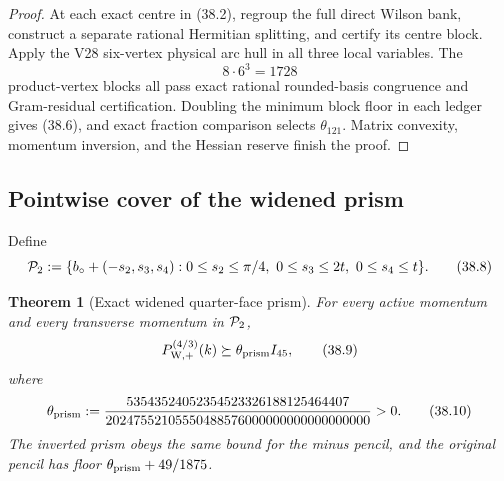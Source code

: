\documentclass[11pt,oneside]{article}
\newtheorem{theorem}{Theorem}[section]
\theoremstyle{definition}
\theoremstyle{remark}
\begin{document}
\begin{proof}
At each exact centre in (38.2), regroup the full direct Wilson bank,
construct a separate rational Hermitian splitting, and certify its
centre block.  Apply the V28 six-vertex physical arc hull in all
three local variables.  The
\[
 8\cdot6^3=1728                                        \tag{38.7}
\]
product-vertex blocks all pass exact rational rounded-basis
congruence and Gram-residual certification.  Doubling the minimum
block floor in each ledger gives (38.6), and exact fraction
comparison selects \(\theta_{121}\).  Matrix convexity, momentum
inversion, and the Hessian reserve finish the proof.
\end{proof}

\subsection{Pointwise cover of the widened prism}

Define
\[
 {\cal P}_2:=
 \{b_\circ+(-s_2,s_3,s_4):
 0\le s_2\le\pi/4,\ 0\le s_3\le2t,\ 0\le s_4\le t\}.
                                                               \tag{38.8}
\]

\begin{theorem}[Exact widened quarter-face prism]
\label{thm:newv38-prism}
For every active momentum and every transverse momentum in
\({\cal P}_2\),
\[
 P_{\mathrm W,+}^{(4/3)}(k)
 \succeq\theta_{\rm prism}I_{45},                     \tag{38.9}
\]
where
\[
 \theta_{\rm prism}:=
\frac{53543524052354523326188125464407}
{20247552105550488576000000000000000000}>0.           \tag{38.10}
\]
The inverted prism obeys the same bound for the minus pencil, and
the original pencil has floor
\(\theta_{\rm prism}+49/1875\).
\end{theorem}
\end{document}

